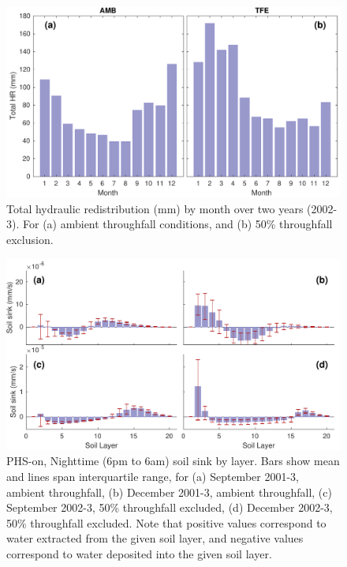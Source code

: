 \documentclass[draft,linenumbers]{agujournal}
\begin{document}
  \clearpage
    \begin{figure}[h]
     \centering
     \includegraphics[width=30pc]{../figs/fig5.pdf}
     \caption{Total hydraulic redistribution (mm) by month over two years (2002-3). For (a) ambient throughfall conditions, and (b) 50\% throughfall exclusion.      }
     \label{fig2}
  \end{figure}
  
    \clearpage
    \begin{figure}[h]
     \centering
     \includegraphics[width=30pc]{../figs/fig6.pdf}
     \caption{PHS-on, Nighttime (6pm to 6am)  soil sink by layer.
          Bars show mean and lines span interquartile range, for 
     (a) September 2001-3, ambient throughfall,
     (b) December 2001-3, ambient throughfall,
     (c) September 2002-3, 50\% throughfall excluded,
     (d) December 2002-3, 50\% throughfall excluded. 
     Note that positive values correspond to water extracted from the given soil layer, 
     and negative values correspond to water deposited into the given soil layer.}
     \label{fig2}
  \end{figure}
  
\end{document}
